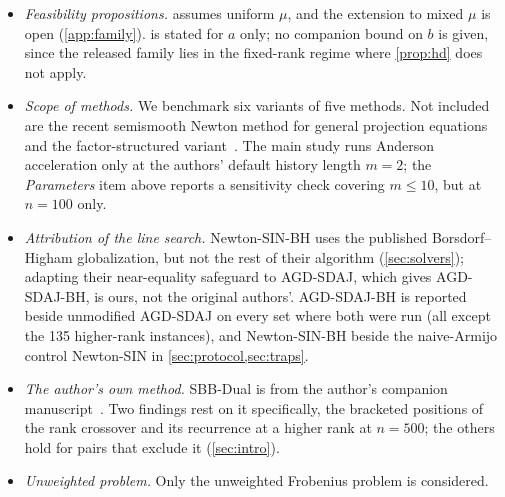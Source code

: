\begin{itemize}
    \cref{sec:cells,sec:n500,sec:highrank,sec:thesis,sec:us2105} to these
    parameters was not checked.
  \item \emph{Feasibility propositions.}  assumes uniform
    $\mu$, and the extension to mixed $\mu$ is open (\cref{app:family}).
     is stated for $a$ only; no companion bound on $b$ is
    given, since the released family lies in the fixed-rank regime where
    \cref{prop:hd} does not apply.
  \item \emph{Scope of methods.} We benchmark six variants of five methods.
    Not included are the recent semismooth Newton method for general
    projection equations~\cite{armijo2025semismooth} and the factor-structured
    variant~\cite{borsdorf2010factor}. The main study runs Anderson
    acceleration only at the authors' default history length $m=2$; the
    \emph{Parameters} item above reports a sensitivity check covering
    $m\le10$, but at $n=100$ only.
  \item \emph{Attribution of the line search.} Newton-SIN-BH uses the
    published Borsdorf--Higham globalization, but not the rest of their
    algorithm (\cref{sec:solvers}); adapting their near-equality safeguard to
    AGD-SDAJ, which gives AGD-SDAJ-BH, is ours, not the original authors'.
    AGD-SDAJ-BH is reported beside unmodified AGD-SDAJ on every set where
    both were run (all except the 135 higher-rank instances), and
    Newton-SIN-BH beside the naive-Armijo control Newton-SIN in
    \cref{sec:protocol,sec:traps}.
  \item \emph{The author's own method.} SBB-Dual is from the author's
    companion manuscript~\cite{ibrahim2026sbb}. Two findings rest on it
    specifically, the bracketed positions of the rank crossover and its
    recurrence at a higher rank at $n=500$; the others hold for pairs that
    exclude it (\cref{sec:intro}).
  \item \emph{Unweighted problem.} Only the unweighted Frobenius problem is
    considered.
\end{itemize}

